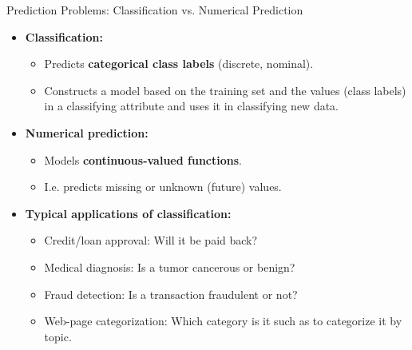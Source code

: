 \begin{frame}{Prediction Problems: Classification vs. Numerical Prediction}
	\begin{itemize}
		\item \textbf{Classification:}
		      \begin{itemize}
			      \item Predicts \textbf{\color{airforceblue}categorical class labels} (discrete, nominal).
			      \item Constructs a model based on the training set and the values (class labels) in a classifying attribute and uses it in classifying new data.
		      \end{itemize}
		\item \textbf{Numerical prediction:}
		      \begin{itemize}
			      \item Models \textbf{\color{airforceblue}continuous-valued functions}.
			      \item I.e. predicts missing or unknown (future) values.
		      \end{itemize}
		\item \textbf{Typical applications of classification:}
		      \begin{itemize}
			      \item Credit/loan approval: Will it be paid back?
			      \item Medical diagnosis: Is a tumor cancerous or benign?
			      \item Fraud detection: Is a transaction fraudulent or not?
			      \item Web-page categorization: Which category is it such as to categorize it by topic.
		      \end{itemize}
	\end{itemize}
\end{frame}

